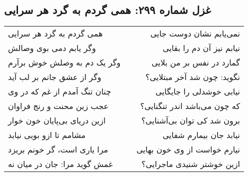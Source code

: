 \begin{center}
\section*{غزل شماره ۲۹۹: همی گردم به گرد هر سرایی}
\label{sec:299}
\begin{longtable}{l p{0.5cm} r}
همی گردم به گرد هر سرایی
&&
نمی‌یابم نشان دوست جایی
\\
وگر یابم دمی بوی وصالش
&&
نیابم نیز آن دم را بقایی
\\
وگر یک دم به وصلش خوش برآرم
&&
گمارد در نفس بر من بلایی
\\
وگر از عشق جانم بر لب آید
&&
نگوید: چون شد آخر مبتلایی؟
\\
چنان تنگ آمدم از غم که در وی
&&
نیابی خوشدلی را جایگایی
\\
عجب زین محنت و رنج فراوان
&&
که چون می‌باشد اندر تنگنایی؟
\\
ازین دریای بی‌پایان خون خوار
&&
برون شد کی توان بی‌آشنایی؟
\\
مشامم تا ازو بویی نیابد
&&
نیابد جان بیمارم شفایی
\\
مرا یاری است، گر خونم بریزد
&&
نیارم خواست از وی خون بهایی
\\
غمش گوید مرا: جان در میان نه
&&
ازین خوشتر شنیدی ماجرایی؟
\\
\end{longtable}
\end{center}

